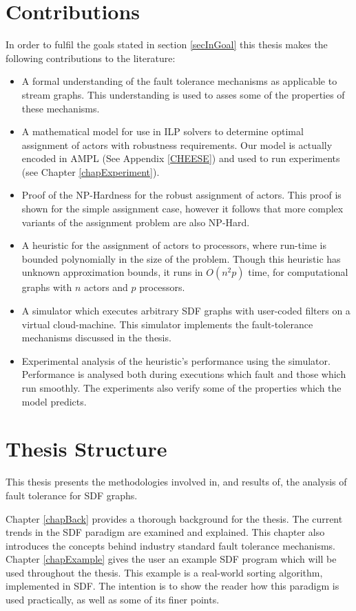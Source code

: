 \section{Contributions}

In order to fulfil the goals stated in section \ref{secInGoal} this thesis makes the following contributions to the literature:

\begin{itemize}
	\item A formal understanding of the fault tolerance mechanisms as applicable to stream graphs.
			This understanding is used to asses some of the properties of these mechanisms.
	\item A mathematical model for use in ILP solvers to determine optimal assignment of actors with robustness requirements.
			Our model is actually encoded in AMPL (See Appendix \ref{CHEESE}) and used to run experiments (see Chapter \ref{chapExperiment}).
	\item Proof of the NP-Hardness for the robust assignment of actors.
			This proof is shown for the simple assignment case, however it follows that more complex variants of the assignment problem are also NP-Hard.
	\item A heuristic for the assignment of actors to processors, where run-time is bounded polynomially in the size of the problem.
			Though this heuristic has unknown approximation bounds, it runs in $O(n^2 p)$ time, for computational graphs with $n$ actors and $p$ processors.
	\item A simulator which executes arbitrary SDF graphs with user-coded filters on a virtual cloud-machine.
			This simulator implements the fault-tolerance mechanisms discussed in the thesis.
	\item Experimental analysis of the heuristic's performance using the simulator.
			Performance is analysed both during executions which fault and those which run smoothly.
			The experiments also verify some of the properties which the model predicts.
\end{itemize}

\section{Thesis Structure}

This thesis presents the methodologies involved in, and results of, the analysis of fault tolerance for SDF graphs.

Chapter \ref{chapBack} provides a thorough background for the thesis.
The current trends in the SDF paradigm are examined and explained.
This chapter also introduces the concepts behind industry standard fault tolerance mechanisms.
Chapter \ref{chapExample} gives the user an example SDF program which will be used throughout the thesis.
This example is a real-world sorting algorithm, implemented in SDF.
The intention is to show the reader how this paradigm is used practically, as well as some of its finer points.

